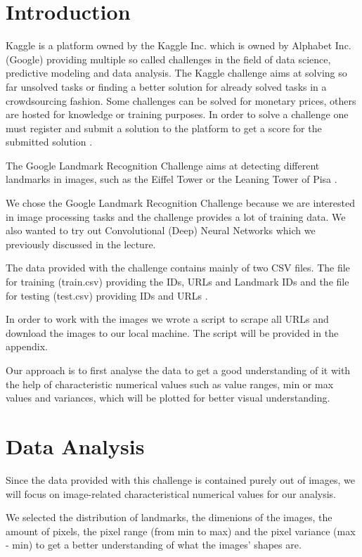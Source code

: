 \chapter{Introduction}

Kaggle is a platform owned by the Kaggle Inc. which is owned by Alphabet Inc. (Google) providing multiple so called challenges in the field of data science, predictive modeling and data analysis. The Kaggle challenge aims at solving so far unsolved tasks or finding a better solution for already solved tasks in a crowdsourcing fashion. Some challenges can be solved for monetary prices, others are hosted for knowledge or training purposes. In order to solve a challenge one must register and submit a solution to the platform to get a score for the submitted solution \cite{kaggle}.

The Google Landmark Recognition Challenge aims at detecting different landmarks in images, such as the Eiffel Tower or the Leaning Tower of Pisa \cite{challenge}.

We chose the Google Landmark Recognition Challenge because we are interested in image processing tasks and the challenge provides a lot of training data. We also wanted to try out Convolutional (Deep) Neural Networks which we previously discussed in the lecture.

The data provided with the challenge contains mainly of two CSV files. The file for training (train.csv) providing the IDs, URLs and Landmark IDs and the file for testing (test.csv) providing IDs and URLs \cite{data}.

In order to work with the images we wrote a script to scrape all URLs and download the images to our local machine. The script will be provided in the appendix.

Our approach is to first analyse the data to get a good understanding of it with the help of characteristic numerical values such as value ranges, min or max values and variances, which will be plotted for better visual understanding.

\chapter{Data Analysis}

Since the data provided with this challenge is contained purely out of images, we will focus on image-related characteristical numerical values for our analysis.

We selected the distribution of landmarks, the dimenions of the images, the amount of pixels, the pixel range (from min to max) and the pixel variance (max - min) to get a better understanding of what the images' shapes are.

